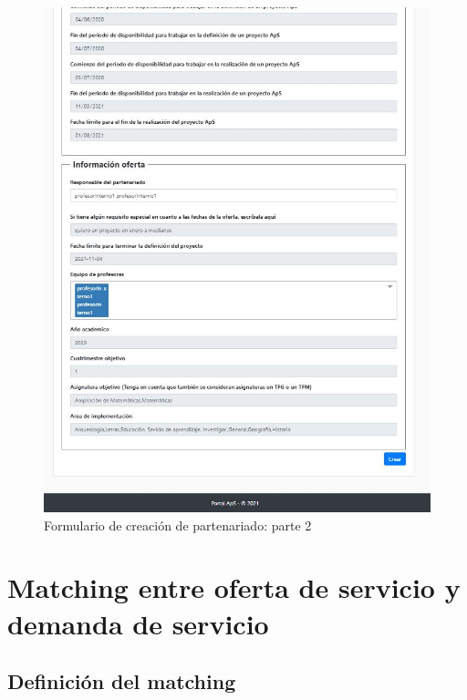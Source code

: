\documentclass[11pt]{book}
\begin{document}
\begin{figure}[t]
	\centering
	\includegraphics[scale=0.9]{partenariado2}
	\caption{Formulario de creación de partenariado: parte 2}
\end{figure}

\chapter{Matching entre oferta de servicio y demanda de servicio}\label{cap:matching}

\section{Definición del matching }
\end{document}
